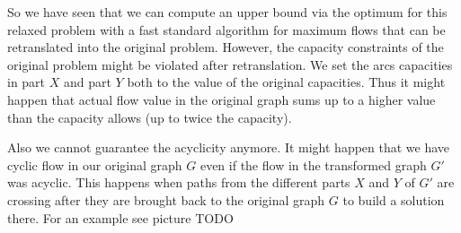 
So we have seen that we can compute an upper bound via the optimum for this relaxed problem with a fast standard 
algorithm for maximum flows that can be retranslated into the original problem. 
However, the capacity constraints of the original problem might be violated after retranslation. We set the arcs 
capacities in part $X$ and part $Y$ both to the value of the original capacities. Thus it might happen that actual flow 
value in the original graph sums up to a higher value than the capacity allows (up to twice the capacity). 

Also we cannot guarantee the acyclicity anymore. It might happen that we have cyclic flow in our 
original graph $G$ even if the flow in the transformed graph $G'$ was acyclic. This happens when paths from 
the different parts $X$ and $Y$ of $G'$ are crossing after they are brought back to the original graph $G$ to 
build a solution there. For an example see picture TODO
